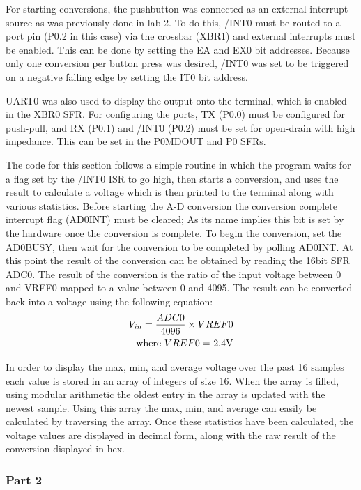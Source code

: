\documentclass[12pt]{article}
\begin{document}
For starting conversions, the pushbutton was connected as an external interrupt source as was previously done in lab 2. To do this, /INT0 must be routed to a port pin (P0.2 in this case) via the crossbar (XBR1) and external interrupts must be enabled. This can be done by setting the EA and EX0 bit addresses. Because only one conversion per button press was desired, /INT0 was set to be triggered on a negative falling edge by setting the IT0 bit address.

UART0 was also used to display the output onto the terminal, which is enabled in the XBR0 SFR. For configuring the ports, TX (P0.0) must be configured for push-pull, and RX (P0.1) and /INT0 (P0.2) must be set for open-drain with high impedance. This can be set in the P0MDOUT and P0 SFRs.

The code for this section follows a simple routine in which the program waits for a flag set by the /INT0  ISR to go high, then starts a conversion, and uses the result to calculate a voltage which is then printed to the terminal along with various statistics. Before starting the A-D conversion the conversion complete interrupt flag (AD0INT) must be cleared; As its name implies this bit is set by the hardware once the conversion is complete. To begin the conversion, set the AD0BUSY, then wait for the conversion to be completed by polling AD0INT. At this point the result of the conversion can be obtained by reading the 16bit SFR ADC0. The result of the conversion is the ratio of the input voltage between 0 and VREF0 mapped to a value between 0 and 4095. The result can be converted back into a voltage using the following equation:
\begin{align*}
V_{in} = \frac{ADC0}{4096} \times VREF0\\\text{where $VREF0 =$ 2.4\si{V}}
\end{align*}

In order to display the max, min, and average voltage over the past 16 samples each value is stored in an array of integers of size 16. When the array is filled, using modular arithmetic the oldest entry in the array is updated with the newest sample. Using this array the max, min, and average can easily be calculated by traversing the array. Once these statistics have been calculated, the voltage values are displayed in decimal form, along with the raw result of the conversion displayed in hex. 

\subsubsection{Part 2}
\end{document}
